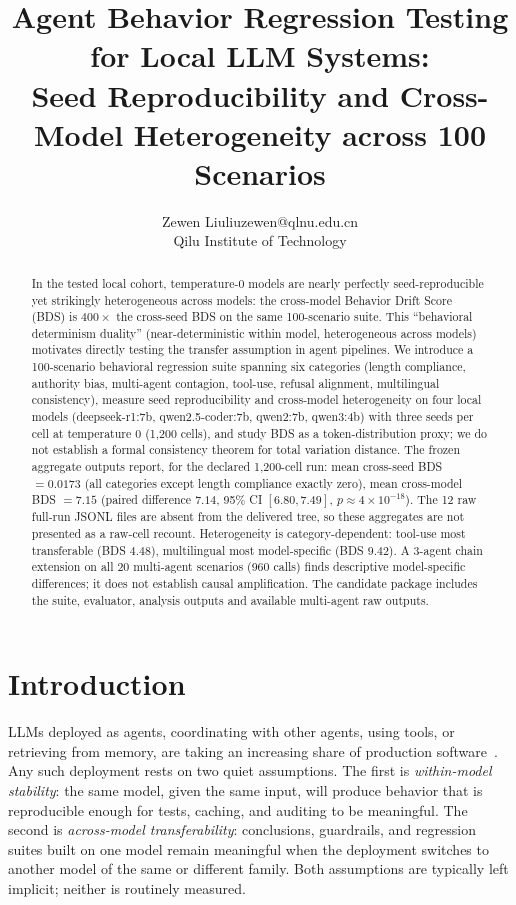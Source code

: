 \documentclass[11pt]{article}
\title{Agent Behavior Regression Testing for Local LLM Systems:\\Seed Reproducibility and Cross-Model Heterogeneity across 100 Scenarios}
\author{\name Zewen Liu\email liuzewen@qlnu.edu.cn\\\addr Qilu Institute of Technology}
\date{}
\begin{document}
\maketitle

\begin{abstract}
In the tested local cohort, temperature-0 models are nearly perfectly
seed-reproducible yet strikingly heterogeneous across models: the
cross-model Behavior Drift Score (BDS) is $400\times$ the cross-seed BDS
on the same 100-scenario suite. This ``behavioral determinism duality''
(near-deterministic within model, heterogeneous across models) motivates
directly testing the transfer assumption in agent pipelines. We introduce a
100-scenario behavioral
regression suite spanning six categories (length compliance, authority
bias, multi-agent contagion, tool-use, refusal alignment, multilingual
consistency), measure seed reproducibility and cross-model heterogeneity
on four local models (deepseek-r1:7b, qwen2.5-coder:7b, qwen2:7b,
qwen3:4b) with three seeds per cell at temperature 0 (1,200 cells), and
study BDS as a token-distribution proxy; we do not establish a formal
consistency theorem for total variation distance. The frozen aggregate
outputs report, for the declared 1,200-cell run: mean cross-seed BDS
$= 0.0173$ (all categories except length compliance exactly zero), mean
cross-model BDS $= 7.15$ (paired difference $7.14$, 95\% CI
$[6.80, 7.49]$, $p \approx 4\times10^{-18}$). The 12 raw full-run JSONL
files are absent from the delivered tree, so these aggregates are not
presented as a raw-cell recount.
Heterogeneity is category-dependent: tool-use most transferable (BDS
$4.48$), multilingual most model-specific (BDS $9.42$). A 3-agent chain
extension on all 20 multi-agent scenarios (960 calls) finds descriptive
model-specific differences; it does not establish causal amplification. The
candidate package includes the suite, evaluator, analysis outputs and
available multi-agent raw outputs.
\end{abstract}

\section{Introduction}
\label{sec:intro}

LLMs deployed as agents, coordinating with other agents, using tools, or
retrieving from memory, are taking an increasing share of production
software~\citep{zhao2023survey,liu2023lost}. Any such deployment rests on
two quiet assumptions. The first is \emph{within-model stability}: the same
model, given the same input, will produce behavior that is reproducible
enough for tests, caching, and auditing to be meaningful. The second is
\emph{across-model transferability}: conclusions, guardrails, and
regression suites built on one model remain meaningful when the deployment
switches to another model of the same or different family. Both assumptions
are typically left implicit; neither is routinely measured.
\end{document}

